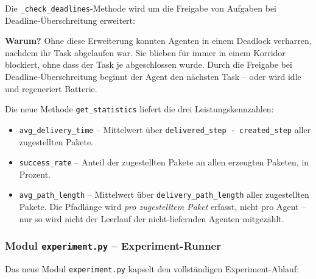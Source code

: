 Die \texttt{\_check\_deadlines}-Methode wird um die Freigabe von Aufgaben bei Deadline-Überschreitung erweitert:



\textbf{Warum?} Ohne diese Erweiterung konnten Agenten in einem Deadlock verharren, nachdem ihr Task abgelaufen war. Sie blieben für immer in einem Korridor blockiert, ohne dass der Task je abgeschlossen wurde. Durch die Freigabe bei Deadline-Überschreitung beginnt der Agent den nächsten Task -- oder wird idle und regeneriert Batterie.

Die neue Methode \texttt{get\_statistics} liefert die drei Leistungskennzahlen:



\begin{itemize}
    \item \texttt{avg\_delivery\_time} -- Mittelwert über \texttt{delivered\_step - created\_step} aller zugestellten Pakete.
    \item \texttt{success\_rate} -- Anteil der zugestellten Pakete an allen erzeugten Paketen, in Prozent.
    \item \texttt{avg\_path\_length} -- Mittelwert über \texttt{delivery\_path\_length} aller zugestellten Pakete. Die Pfadlänge wird \textit{pro zugestelltem Paket} erfasst, nicht pro Agent -- nur so wird nicht der Leerlauf der nicht-liefernden Agenten mitgezählt.
\end{itemize}


\subsubsection{Modul \texttt{experiment.py} – Experiment-Runner}

Das neue Modul \texttt{experiment.py} kapselt den vollständigen Experiment-Ablauf:



